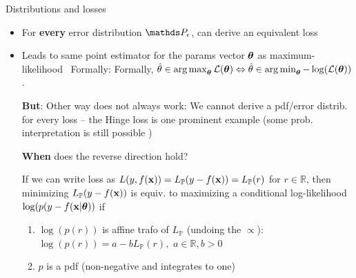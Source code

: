 \documentclass[11pt,compress,t,notes=noshow, xcolor=table]{beamer}
\begin{document}
\begin{vbframe}{Distributions and losses}

\begin{itemize}

\item For \textbf{every} error distribution $\P_\eps$, can derive an equivalent loss
\item Leads to same point estimator for the params vector $\bm{\theta}$ as maximum-likelihood
\
Formally: Formally, $\hat{\theta} \in \operatorname*{arg\,max}_{\bm{\theta}} \mathcal{L}(\bm{\theta}) \Leftrightarrow \hat{\theta} \in \operatorname*{arg\,min}_{\bm{\theta}}-\log(\mathcal{L}(\bm{\theta}))$.  %
    
\vspace{0.2cm}    
\textbf{But}: Other way does not always work: We cannot derive a pdf/error distrib. for every loss -- the Hinge loss is one prominent example (some prob. interpretation is still possible )

\vspace{0.2cm}
\textbf{When} does the reverse direction hold?

If we can write loss as $L(y,f(\mathbf{x}))=L_{\mathbb{P}}(y-f(\mathbf{x}))=L_{\mathbb{P}}(r)$ for $r \in \mathbb{R}$, then minimizing $L_{\mathbb{P}}(y-f(\mathbf{x}))$ is equiv. to maximizing a conditional log-likelihood $\log(p(y-f(\mathbf{x}|\bm{\theta}))$ if
\begin{enumerate}
 \setlength{\itemsep}{1.0em}
    \item $\log(p(r))$ is affine trafo of $L_{\mathbb{P}}$ (undoing the $\propto$):
    $\log(p(r)) = a - bL_{\mathbb{P}}(r),\,\,a \in \mathbb{R}, b>0$
    \item  $p$ is a pdf (non-negative and integrates to one)
\end{enumerate}


\end{itemize}


\end{vbframe}


\endlecture
\end{document}

